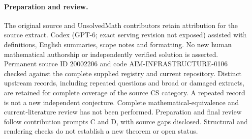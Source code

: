 \documentclass[11pt]{article}
\begin{document}
\paragraph{Preparation and review.}
The original source and UnsolvedMath contributors retain attribution for the source extract. Codex (GPT-6; exact serving revision not exposed) assisted with definitions, English summaries, scope notes and formatting. No new human mathematical authorship or independently verified solution is asserted. Permanent source ID 20002206 and code AIM-INFRASTRUCTURE-0106 checked against the complete supplied registry and current repository. Distinct upstream records, including repeated questions and broad or damaged extracts, are retained for complete coverage of the source CS category. A repeated record is not a new independent conjecture. Complete mathematical-equivalence and current-literature review has not been performed. Preparation and final review follow contribution prompts C and D, with source gaps disclosed. Structural and rendering checks do not establish a new theorem or open status.
\label{end:20002206}
\end{document}
